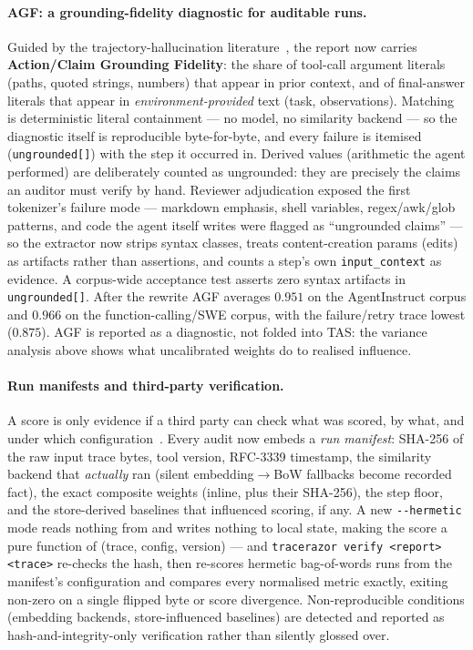 \documentclass[11pt]{article}
\newcommand{\code}[1]{\texttt{#1}}
\begin{document}
\paragraph{AGF: a grounding-fidelity diagnostic for auditable runs.} Guided by
the trajectory-hallucination literature~\cite{trajhall}, the report now carries
\textbf{Action/Claim Grounding Fidelity}: the share of tool-call argument
literals (paths, quoted strings, numbers) that appear in prior context, and of
final-answer literals that appear in \emph{environment-provided} text (task,
observations). Matching is deterministic literal containment --- no model, no
similarity backend --- so the diagnostic itself is reproducible byte-for-byte,
and every failure is itemised (\code{ungrounded[]}) with the step it occurred
in. Derived values (arithmetic the agent performed) are deliberately counted as
ungrounded: they are precisely the claims an auditor must verify by hand.
Reviewer adjudication exposed the first tokenizer's failure mode --- markdown
emphasis, shell variables, regex/awk/glob patterns, and code the agent itself
writes were flagged as ``ungrounded claims'' --- so the extractor now strips
syntax classes, treats content-creation params (edits) as artifacts rather
than assertions, and counts a step's own \code{input\_context} as evidence.
A corpus-wide acceptance test asserts zero syntax artifacts in
\code{ungrounded[]}. After the rewrite AGF averages $0.951$ on the
AgentInstruct corpus and $0.966$ on the function-calling/SWE corpus, with the
failure/retry trace lowest ($0.875$).
AGF is reported as a diagnostic, not folded into TAS: the variance analysis
above shows what uncalibrated weights do to realised influence.

\paragraph{Run manifests and third-party verification.} A score is only
evidence if a third party can check what was scored, by what, and under which
configuration~\cite{provagent}. Every audit now embeds a \emph{run manifest}:
SHA-256 of the raw input trace bytes, tool version, RFC-3339 timestamp, the
similarity backend that \emph{actually} ran (silent embedding$\to$BoW fallbacks
become recorded fact), the exact composite weights (inline, plus their
SHA-256), the step floor, and the store-derived baselines that influenced
scoring, if any. A new \code{-{}-hermetic} mode reads nothing from and writes
nothing to local state, making the score a pure function of (trace, config,
version) --- and \code{tracerazor verify <report> <trace>} re-checks the hash,
then re-scores hermetic bag-of-words runs from the manifest's configuration
and compares every normalised metric exactly, exiting non-zero on a single
flipped byte or score divergence. Non-reproducible conditions (embedding
backends, store-influenced baselines) are detected and reported as
hash-and-integrity-only verification rather than silently glossed over.
\end{document}
